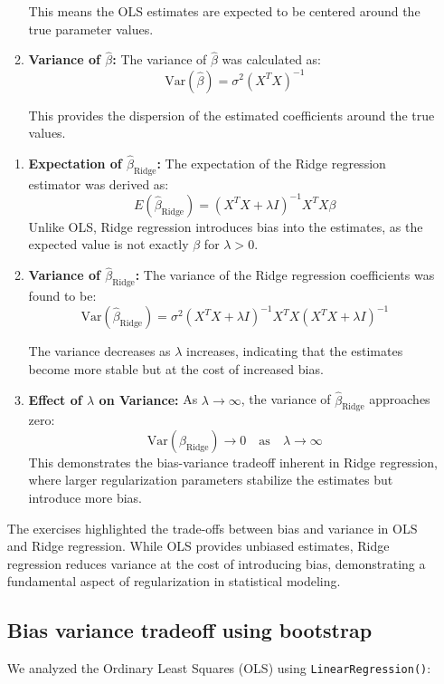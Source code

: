 \documentclass{article}
\begin{document}
\begin{enumerate}
\begin{enumerate}
This means the OLS estimates are expected to be centered around the true parameter values. 
    \item \textbf{Variance of $\hat{\beta}$:} The variance of $\hat{\beta}$ was calculated as:
    \[
    \text{Var}(\hat{\beta}) = \sigma^2 (X^T X)^{-1}
    \]

This provides the dispersion of the estimated coefficients around the true values.  \end{enumerate}

\begin{enumerate}
    \item \textbf{Expectation of $\hat{\beta}_{\text{Ridge}}$:} The expectation of the Ridge regression estimator was derived as:
    \[
    E(\hat{\beta}_{\text{Ridge}}) = (X^T X + \lambda I)^{-1} X^T X \beta
    \]
    Unlike OLS, Ridge regression introduces bias into the estimates, as the expected value is not exactly $\beta$ for $\lambda > 0$.
    
    \item \textbf{Variance of $\hat{\beta}_{\text{Ridge}}$:} The variance of the Ridge regression coefficients was found to be:
    \[
    \text{Var}(\hat{\beta}_{\text{Ridge}}) = \sigma^2 (X^T X + \lambda I)^{-1} X^T X (X^T X + \lambda I)^{-1}
    \]

    The variance decreases as $\lambda$ increases, indicating that the estimates become more stable but at the cost of increased bias.
    
    \item \textbf{Effect of $\lambda$ on Variance:} As $\lambda \to \infty$, the variance of $\hat{\beta}_{\text{Ridge}}$ approaches zero:
    \[
    \text{Var}(\hat{\beta}_{\text{Ridge}}) \to 0 \quad \text{as} \quad \lambda \to \infty
    \]
    This demonstrates the bias-variance tradeoff inherent in Ridge regression, where larger regularization parameters stabilize the estimates but introduce more bias.
\end{enumerate}

The exercises highlighted the trade-offs between bias and variance in OLS and Ridge regression. While OLS provides unbiased estimates, Ridge regression reduces variance at the cost of introducing bias, demonstrating a fundamental aspect of regularization in statistical modeling.
\newpage
\subsection{Bias variance tradeoff using bootstrap}
We analyzed the Ordinary Least Squares (OLS) using \texttt{LinearRegression()}:


\end{enumerate}
\end{document}
